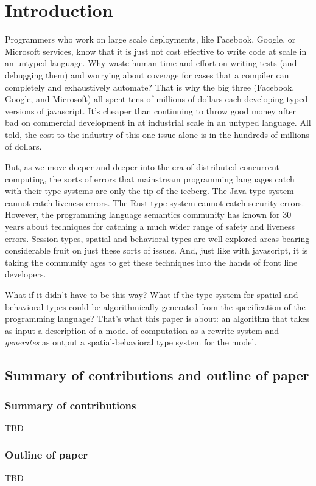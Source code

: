 \section{Introduction}\label{sec:introduction} %

Programmers who work on large scale deployments, like Facebook,
Google, or Microsoft services, know that it is just not cost effective
to write code at scale in an untyped language. Why waste human time
and effort on writing tests (and debugging them) and worrying about
coverage for cases that a compiler can completely and exhaustively
automate? That is why the big three (Facebook, Google, and Microsoft)
all spent tens of millions of dollars each developing typed versions
of javascript. It's cheaper than continuing to throw good money
after bad on commercial development in at industrial scale in an
untyped language. All told, the cost to the industry of this one issue
alone is in the hundreds of millions of dollars.

But, as we move deeper and deeper into the era of distributed
concurrent computing, the sorts of errors that mainstream programming
languages catch with their type systems are only the tip of the
iceberg. The Java type system cannot catch liveness errors. The Rust
type system cannot catch security errors. However, the programming
language semantics community has known for 30 years about techniques
for catching a much wider range of safety and liveness errors. Session
types, spatial and behavioral types are well explored areas bearing
considerable fruit on just these sorts of issues. And, just like with
javascript, it is taking the community ages to get these techniques
into the hands of front line developers.

What if it didn't have to be this way? What if the type system for
spatial and behavioral types could be algorithmically generated from
the specification of the programming language? That's what this paper
is about: an algorithm that takes as input a description of a model of
computation as a rewrite system and \emph{generates} as output a
spatial-behavioral type system for the model.

\subsection{Summary of contributions and outline of paper}

\subsubsection{Summary of contributions}
TBD

\subsubsection{Outline of paper}
TBD

